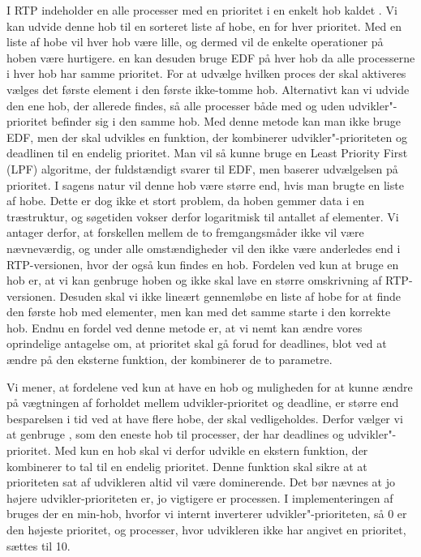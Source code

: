I RTP  indeholder \sched en alle processer med en prioritet i en enkelt hob kaldet . Vi kan udvide denne hob til en sorteret liste af hobe, en for hver prioritet. Med en liste af hobe vil hver hob være lille, og dermed vil de enkelte operationer på hoben være hurtigere. \Sched en kan desuden bruge EDF på hver hob da alle processerne i hver hob har samme prioritet. For at udvælge hvilken proces der skal aktiveres vælges det første element i den første ikke-tomme hob. 
Alternativt kan vi udvide den ene hob, der allerede findes, så alle processer både med og uden udvikler"-prioritet befinder sig i den samme hob. Med denne metode kan man ikke bruge EDF, men der skal udvikles en funktion, der kombinerer  udvikler"-prioriteten og deadlinen til en endelig prioritet. Man vil så kunne bruge en Least Priority First (LPF) algoritme, der fuldstændigt svarer til EDF, men baserer udvælgelsen på prioritet. I sagens natur vil denne hob  være større end, hvis man brugte en liste af hobe. Dette er dog ikke et stort problem, da hoben gemmer data i en træstruktur, og søgetiden vokser derfor logaritmisk til antallet af elementer. Vi antager derfor, at forskellen mellem de to fremgangsmåder ikke vil være nævneværdig, og under alle omstændigheder vil den ikke være anderledes end i RTP-versionen, hvor der også kun findes en hob. Fordelen ved kun at bruge en hob er, at vi kan genbruge  hoben og  ikke skal lave en større omskrivning af RTP-versionen. Desuden skal vi ikke lineært gennemløbe en liste af hobe for at finde den første hob med elementer, men kan med det samme starte i den korrekte hob. Endnu en fordel ved denne metode er, at vi nemt kan  ændre vores oprindelige antagelse om, at prioritet skal gå forud for deadlines, blot ved at ændre på den eksterne funktion, der kombinerer de to parametre.

Vi mener, at fordelene ved kun at have en hob og muligheden for at kunne ændre på vægtningen af forholdet mellem udvikler-prioritet og deadline, er større end besparelsen i tid ved at have flere hobe, der skal vedligeholdes. Derfor vælger vi  at genbruge , som den eneste hob til  processer, der har deadlines og udvikler"-prioritet. Med kun en hob skal vi derfor udvikle en ekstern funktion, der kombinerer to tal til en endelig prioritet. Denne funktion skal sikre at at prioriteten sat af udvikleren altid vil være dominerende. Det bør nævnes at jo højere udvikler-prioriteten er, jo vigtigere er processen. I implementeringen af  bruges der en min-hob, hvorfor vi internt inverterer udvikler"-prioriteten, så 0 er den højeste prioritet, og processer, hvor udvikleren ikke har angivet en prioritet, sættes til 10.

